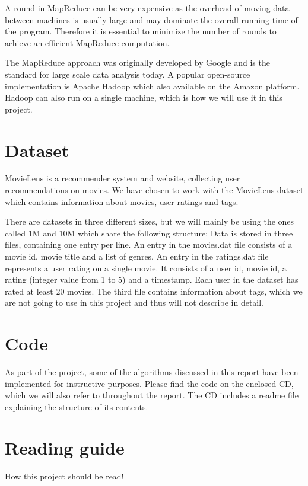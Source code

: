 A round in MapReduce can be very expensive as the overhead of moving data between machines is usually large and may dominate the overall running time of the program. Therefore it is essential to minimize the number of rounds to achieve an efficient MapReduce computation.

The MapReduce approach was originally developed by Google and is the standard for large scale data analysis today. A popular open-source implementation is Apache Hadoop which also available on the Amazon platform. Hadoop can also run on a single machine, which is how we will use it in this project.



\section{Dataset}
MovieLens is a recommender system and website\cite{movielens}, collecting user recommendations on movies. We have chosen to work with the MovieLens dataset\cite{grouplens} which contains information about movies, user ratings and tags.

There are datasets in three different sizes, but we will mainly be using the ones called 1M and 10M which share the following structure: Data is stored in three files, containing one entry per line. An entry in the movies.dat file consists of a movie id, movie title and a list of genres. An entry in the ratings.dat file represents a user rating on a single movie. It consists of a user id, movie id, a rating (integer value from 1 to 5) and a timestamp. Each user in the dataset has rated at least 20 movies. The third file contains information about tags, which we are not going to use in this project and thus will not describe in detail.

\section{Code}
As part of the project, some of the algorithms discussed in this report have been implemented for instructive purposes. Please find the code on the enclosed CD, which we will also refer to throughout the report. The CD includes a readme file explaining the structure of its contents. 

\section{Reading guide}
How this project should be read!
